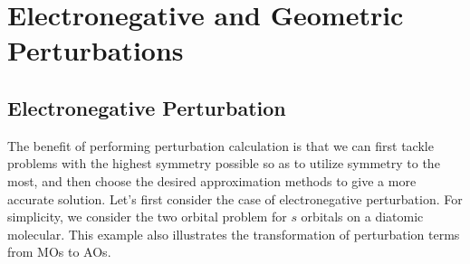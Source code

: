\documentclass{article}
\begin{document}
\section{Electronegative and Geometric Perturbations}
\subsection{Electronegative Perturbation}
The benefit of performing perturbation calculation is that we can first tackle 
problems with the highest symmetry possible so as to utilize symmetry to the most,
and then choose the desired approximation methods to give a more accurate 
solution. Let's first consider the case of electronegative perturbation. For simplicity, 
we consider the two orbital problem for $s$ orbitals on a diatomic molecular. This 
example also illustrates the transformation of perturbation terms from MOs to AOs. 
\end{document}
